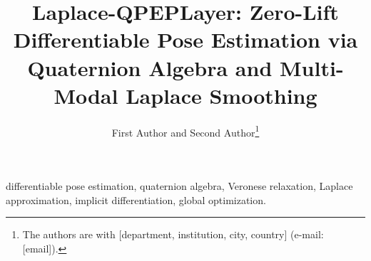 \documentclass[journal]{IEEEtran}
\begin{document}
\title{Laplace-QPEPLayer: Zero-Lift Differentiable Pose Estimation via Quaternion Algebra and Multi-Modal Laplace Smoothing}

\author{First Author and Second Author\thanks{The authors are with [department, institution, city, country] (e-mail: [email]).}}

\maketitle

\begin{abstract}

\end{abstract}

\begin{IEEEkeywords}
differentiable pose estimation, quaternion algebra, Veronese relaxation, Laplace approximation, implicit differentiation, global optimization.
\end{IEEEkeywords}









\appendices




\end{document}
